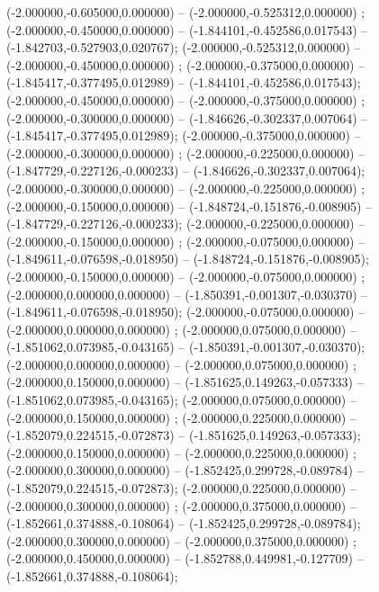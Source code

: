  (-2.000000,-0.605000,0.000000) -- (-2.000000,-0.525312,0.000000) ;
 (-2.000000,-0.450000,0.000000) -- (-1.844101,-0.452586,0.017543) -- (-1.842703,-0.527903,0.020767);
 (-2.000000,-0.525312,0.000000) -- (-2.000000,-0.450000,0.000000) ;
 (-2.000000,-0.375000,0.000000) -- (-1.845417,-0.377495,0.012989) -- (-1.844101,-0.452586,0.017543);
 (-2.000000,-0.450000,0.000000) -- (-2.000000,-0.375000,0.000000) ;
 (-2.000000,-0.300000,0.000000) -- (-1.846626,-0.302337,0.007064) -- (-1.845417,-0.377495,0.012989);
 (-2.000000,-0.375000,0.000000) -- (-2.000000,-0.300000,0.000000) ;
 (-2.000000,-0.225000,0.000000) -- (-1.847729,-0.227126,-0.000233) -- (-1.846626,-0.302337,0.007064);
 (-2.000000,-0.300000,0.000000) -- (-2.000000,-0.225000,0.000000) ;
 (-2.000000,-0.150000,0.000000) -- (-1.848724,-0.151876,-0.008905) -- (-1.847729,-0.227126,-0.000233);
 (-2.000000,-0.225000,0.000000) -- (-2.000000,-0.150000,0.000000) ;
 (-2.000000,-0.075000,0.000000) -- (-1.849611,-0.076598,-0.018950) -- (-1.848724,-0.151876,-0.008905);
 (-2.000000,-0.150000,0.000000) -- (-2.000000,-0.075000,0.000000) ;
 (-2.000000,0.000000,0.000000) -- (-1.850391,-0.001307,-0.030370) -- (-1.849611,-0.076598,-0.018950);
 (-2.000000,-0.075000,0.000000) -- (-2.000000,0.000000,0.000000) ;
 (-2.000000,0.075000,0.000000) -- (-1.851062,0.073985,-0.043165) -- (-1.850391,-0.001307,-0.030370);
 (-2.000000,0.000000,0.000000) -- (-2.000000,0.075000,0.000000) ;
 (-2.000000,0.150000,0.000000) -- (-1.851625,0.149263,-0.057333) -- (-1.851062,0.073985,-0.043165);
 (-2.000000,0.075000,0.000000) -- (-2.000000,0.150000,0.000000) ;
 (-2.000000,0.225000,0.000000) -- (-1.852079,0.224515,-0.072873) -- (-1.851625,0.149263,-0.057333);
 (-2.000000,0.150000,0.000000) -- (-2.000000,0.225000,0.000000) ;
 (-2.000000,0.300000,0.000000) -- (-1.852425,0.299728,-0.089784) -- (-1.852079,0.224515,-0.072873);
 (-2.000000,0.225000,0.000000) -- (-2.000000,0.300000,0.000000) ;
 (-2.000000,0.375000,0.000000) -- (-1.852661,0.374888,-0.108064) -- (-1.852425,0.299728,-0.089784);
 (-2.000000,0.300000,0.000000) -- (-2.000000,0.375000,0.000000) ;
 (-2.000000,0.450000,0.000000) -- (-1.852788,0.449981,-0.127709) -- (-1.852661,0.374888,-0.108064);
